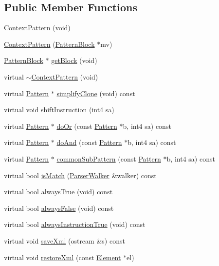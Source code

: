 \subsection*{Public Member Functions}
\begin{DoxyCompactItemize}
\item 
\mbox{\hyperlink{class_context_pattern_a66b65ac40587ea7fcb7056341ae5a217}{Context\+Pattern}} (void)
\item 
\mbox{\hyperlink{class_context_pattern_a2b3f651f71bc240b9eabc99e0aa41b52}{Context\+Pattern}} (\mbox{\hyperlink{class_pattern_block}{Pattern\+Block}} $\ast$mv)
\item 
\mbox{\hyperlink{class_pattern_block}{Pattern\+Block}} $\ast$ \mbox{\hyperlink{class_context_pattern_aed7d47ba0d1e4c2e028f6c04fec131da}{get\+Block}} (void)
\item 
virtual \mbox{\hyperlink{class_context_pattern_af9738f7fdf8fcf39acec1c65f7ec023e}{$\sim$\+Context\+Pattern}} (void)
\item 
virtual \mbox{\hyperlink{class_pattern}{Pattern}} $\ast$ \mbox{\hyperlink{class_context_pattern_a42838644f963d9b251c0d221c20c8116}{simplify\+Clone}} (void) const
\item 
virtual void \mbox{\hyperlink{class_context_pattern_acc26908cd60dbce4c4e13afed17036ba}{shift\+Instruction}} (int4 sa)
\item 
virtual \mbox{\hyperlink{class_pattern}{Pattern}} $\ast$ \mbox{\hyperlink{class_context_pattern_aa80ff4baf1fae14a7e5cd744d1409620}{do\+Or}} (const \mbox{\hyperlink{class_pattern}{Pattern}} $\ast$b, int4 sa) const
\item 
virtual \mbox{\hyperlink{class_pattern}{Pattern}} $\ast$ \mbox{\hyperlink{class_context_pattern_acffa2b64552acaf8824b2093119f9eca}{do\+And}} (const \mbox{\hyperlink{class_pattern}{Pattern}} $\ast$b, int4 sa) const
\item 
virtual \mbox{\hyperlink{class_pattern}{Pattern}} $\ast$ \mbox{\hyperlink{class_context_pattern_a6fb24df62ecafb88fb1a41e8b710ab62}{common\+Sub\+Pattern}} (const \mbox{\hyperlink{class_pattern}{Pattern}} $\ast$b, int4 sa) const
\item 
virtual bool \mbox{\hyperlink{class_context_pattern_ae9007dafab8003fbde577e75813000d1}{is\+Match}} (\mbox{\hyperlink{class_parser_walker}{Parser\+Walker}} \&walker) const
\item 
virtual bool \mbox{\hyperlink{class_context_pattern_aa3a3b46175e110b361f342ad411a2c80}{always\+True}} (void) const
\item 
virtual bool \mbox{\hyperlink{class_context_pattern_a61a99b63f09aed4e7a18933eba517b90}{always\+False}} (void) const
\item 
virtual bool \mbox{\hyperlink{class_context_pattern_addfef0aa6b03d6d6c3cce66bd64b903d}{always\+Instruction\+True}} (void) const
\item 
virtual void \mbox{\hyperlink{class_context_pattern_a405d7ca6e777696895091684d1debfd8}{save\+Xml}} (ostream \&s) const
\item 
virtual void \mbox{\hyperlink{class_context_pattern_a0a49308ce8b3b8b66226f78911f5d0ec}{restore\+Xml}} (const \mbox{\hyperlink{class_element}{Element}} $\ast$el)
\end{DoxyCompactItemize}
